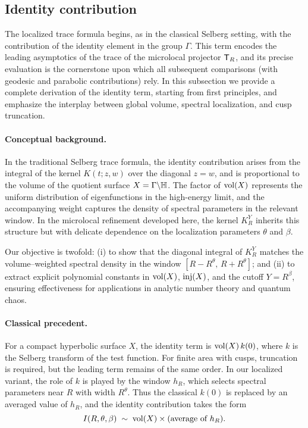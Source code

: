 \subsection{Identity contribution}\label{subsec:geom-identity}

The localized trace formula begins, as in the classical Selberg setting, with the
contribution of the identity element in the group $\Gamma$. This term encodes the
leading asymptotics of the trace of the microlocal projector $\mathsf{T}_R$, and its precise
evaluation is the cornerstone upon which all subsequent comparisons (with geodesic
and parabolic contributions) rely. In this subsection we provide a complete derivation
of the identity term, starting from first principles, and emphasize the interplay
between global volume, spectral localization, and cusp truncation.

\paragraph{Conceptual background.}
In the traditional Selberg trace formula, the identity contribution arises from the
integral of the kernel $K(t;z,w)$ over the diagonal $z=w$, and is proportional to
the volume of the quotient surface $X=\Gamma\backslash\mathbb{H}$. The factor of $\operatorname{vol}(X)$
represents the uniform distribution of eigenfunctions in the high-energy limit,
and the accompanying weight captures the density of spectral parameters in the
relevant window. In the microlocal refinement developed here, the kernel $K_R^Y$
inherits this structure but with delicate dependence on the localization parameters
$\theta$ and $\beta$.

Our objective is twofold: (i) to show that the diagonal integral of $K_R^Y$ matches
the volume–weighted spectral density in the window $[R-R^\theta,\,R+R^\theta]$; and
(ii) to extract explicit polynomial constants in $\operatorname{vol}(X)$, $\mathrm{inj}(X)$, and the
cutoff $Y=R^\beta$, ensuring effectiveness for applications in analytic number
theory and quantum chaos.

\paragraph{Classical precedent.}
For a compact hyperbolic surface $X$, the identity term is $\operatorname{vol}(X)\,k(0)$, where
$k$ is the Selberg transform of the test function. For finite area with cusps,
truncation is required, but the leading term remains of the same order. In our
localized variant, the role of $k$ is played by the window $h_R$, which selects
spectral parameters near $R$ with width $R^\theta$. Thus the classical $k(0)$ is
replaced by an averaged value of $h_R$, and the identity contribution takes the form
\[
I(R,\theta,\beta) \;\sim\; \operatorname{vol}(X)\times\text{(average of $h_R$)}.
\]

